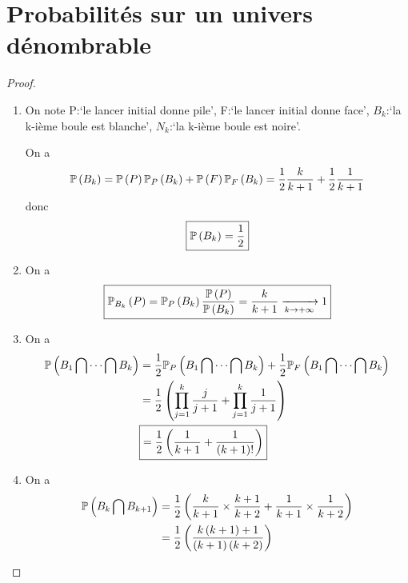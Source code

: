 \section{Probabilités sur un univers dénombrable}

\begin{proof}
    \phantom{}
    \begin{enumerate}
        \item On note P:`le lancer initial donne pile', F:`le lancer initial donne face', $B_{k}$:`la k-ième boule est blanche', $N_{k}$:`la k-ième boule est noire'.
        
        On a 
        \begin{equation}
            \P\left(B_{k}\right)=\P\left(P\right)\P_{P}\left(B_{k}\right)+\P\left(F\right)\P_{F}\left(B_{k}\right)=\frac{1}{2}\frac{k}{k+1}+\frac{1}{2}\frac{1}{k+1}
        \end{equation}
        donc 
        \begin{equation}
            \boxed{\P\left(B_{k}\right)=\frac{1}{2}}
        \end{equation}

        \item On a 
        \begin{equation}
            \boxed{\P_{B_{k}}\left(P\right)=\P_{P}\left(B_{k}\right)\frac{\P\left(P\right)}{\P\left(B_{k}\right)}=\frac{k}{k+1}\xrightarrow[k\to+\infty]{}1}
        \end{equation}

        \item On a 
        \begin{align}
            \P\left(B_{1}\bigcap\dots\bigcap B_{k}\right)
            &=\frac{1}{2}\P_{P}\left(B_{1}\bigcap\dots\bigcap B_{k}\right)+\frac{1}{2}\P_{F}\left(B_{1}\bigcap\dots\bigcap B_{k}\right)\\
            &=\frac{1}{2}\left(\prod_{j=1}^{k}\frac{j}{j+1}+\prod_{j=1}^{k}\frac{1}{j+1}\right)\\
            &\boxed{=\frac{1}{2}\left(\frac{1}{k+1}+\frac{1}{(k+1)!}\right)}
        \end{align}

        \item On a 
        \begin{align}
            \P\left(B_{k}\bigcap B_{k+1}\right)
            &=\frac{1}{2}\left(\frac{k}{k+1}\times\frac{k+1}{k+2}+\frac{1}{k+1}\times\frac{1}{k+2}\right)\\
            &=\frac{1}{2}\left(\frac{k\left(k+1\right)+1}{\left(k+1\right)\left(k+2\right)}\right)
        \end{align}


\end{enumerate}
\end{proof}
